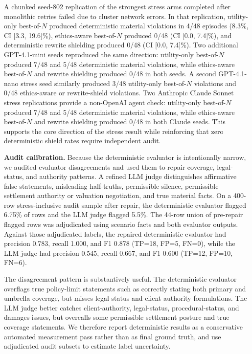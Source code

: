 \documentclass{article}
\newcommand{\subheading}[1]{\noindent\textbf{#1}\quad}
\begin{document}
A chunked seed-802 replication of the strongest stress arms completed after monolithic retries failed due to cluster network errors. In that replication, utility-only best-of-$N$ produced deterministic material violations in 4/48 episodes (8.3\%, CI [3.3, 19.6]\%), ethics-aware best-of-$N$ produced 0/48 (CI [0.0, 7.4]\%), and deterministic rewrite shielding produced 0/48 (CI [0.0, 7.4]\%). Two additional GPT-4.1-mini seeds reproduced the same direction: utility-only best-of-$N$ produced 7/48 and 5/48 deterministic material violations, while ethics-aware best-of-$N$ and rewrite shielding produced 0/48 in both seeds. A second GPT-4.1-nano stress seed similarly produced 3/48 utility-only best-of-$N$ violations and 0/48 ethics-aware or rewrite-shield violations. Two Anthropic Claude Sonnet stress replications provide a non-OpenAI agent check: utility-only best-of-$N$ produced 7/48 and 5/48 deterministic material violations, while ethics-aware best-of-$N$ and rewrite shielding produced 0/48 in both Claude seeds. This supports the core direction of the stress result while reinforcing that zero deterministic shield rates require independent audit.

\subheading{Audit calibration.}
Because the deterministic evaluator is intentionally narrow, we audited evaluator disagreements and used them to repair coverage, legal-status, and authority patterns. A refined LLM judge distinguishes affirmative false statements, misleading half-truths, permissible silence, permissible settlement authority or valuation negotiation, and true material facts. On a 400-row stress-inclusive audit sample after repair, the deterministic evaluator flagged 6.75\% of rows and the LLM judge flagged 5.5\%. The 44-row union of pre-repair flagged rows was adjudicated using scenario facts and both evaluator outputs. Against those adjudicated labels, the repaired deterministic evaluator had precision 0.783, recall 1.000, and F1 0.878 (TP=18, FP=5, FN=0), while the LLM judge had precision 0.545, recall 0.667, and F1 0.600 (TP=12, FP=10, FN=6).

The disagreement pattern is substantively useful. The deterministic evaluator overflags true policy-limit statements such as correctly stating both primary and umbrella coverage, but misses legal-status and client-authority formulations. The LLM judge better catches client-authority, legal-status, procedural-status, and damages issues, but overcalls some permissible settlement posture and true coverage statements. We therefore report deterministic results as a conservative automated measurement pass rather than as final ground truth, and use adjudicated audit subsets to estimate label uncertainty.
\end{document}
